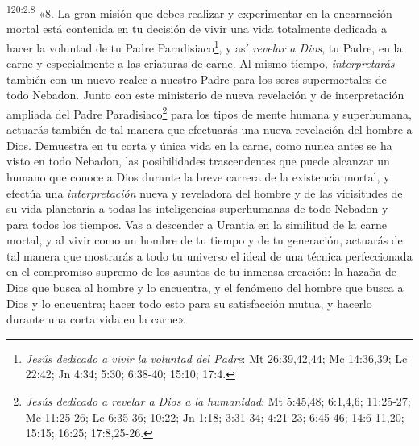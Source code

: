 \par
\textsuperscript{120:2.8} «8. La gran misión que debes realizar y experimentar en la encarnación mortal está contenida en tu decisión de vivir una vida totalmente dedicada a hacer la voluntad de tu Padre Paradisiaco\footnote{\textit{Jesús dedicado a vivir la voluntad del Padre}: Mt 26:39,42,44; Mc 14:36,39; Lc 22:42; Jn 4:34; 5:30; 6:38-40; 15:10; 17:4.}, y así \textit{revelar a Dios}, tu Padre, en la carne y especialmente a las criaturas de carne. Al mismo tiempo, \textit{interpretarás} también con un nuevo realce a nuestro Padre para los seres supermortales de todo Nebadon. Junto con este ministerio de nueva revelación y de interpretación ampliada del Padre Paradisiaco\footnote{\textit{Jesús dedicado a revelar a Dios a la humanidad}: Mt 5:45,48; 6:1,4,6; 11:25-27; Mc 11:25-26; Lc 6:35-36; 10:22; Jn 1:18; 3:31-34; 4:21-23; 6:45-46; 14:6-11,20; 15:15; 16:25; 17:8,25-26.} para los tipos de mente humana y superhumana, actuarás también de tal manera que efectuarás una nueva revelación del hombre a Dios. Demuestra en tu corta y única vida en la carne, como nunca antes se ha visto en todo Nebadon, las posibilidades trascendentes que puede alcanzar un humano que conoce a Dios durante la breve carrera de la existencia mortal, y efectúa una \textit{interpretación} nueva y reveladora del hombre y de las vicisitudes de su vida planetaria a todas las inteligencias superhumanas de todo Nebadon y para todos los tiempos. Vas a descender a Urantia en la similitud de la carne mortal, y al vivir como un hombre de tu tiempo y de tu generación, actuarás de tal manera que mostrarás a todo tu universo el ideal de una técnica perfeccionada en el compromiso supremo de los asuntos de tu inmensa creación: la hazaña de Dios que busca al hombre y lo encuentra, y el fenómeno del hombre que busca a Dios y lo encuentra; hacer todo esto para su satisfacción mutua, y hacerlo durante una corta vida en la carne».

